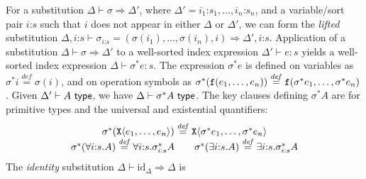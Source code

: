 \documentclass{sigplanconf}
\newcommand{\id}{\mathrm{id}}
\newcommand{\indexOp}[1]{\textup{\texttt{#1}}}
\newcommand{\tyPrim}[2]{\textup{\texttt{#1}}\langle #2 \rangle}
\newcommand{\isType}{\textup{\textsf{ type}}}
\newtheorem{lemma}{Lemma}
\newcommand{\isDefinedAs}{\stackrel{\mathit{def}}=}
\theoremstyle{examplestyle}
\theoremstyle{restatementstyle}
\begin{document}
For a substitution $\Delta \vdash \sigma \Rightarrow
\Delta'$, where $\Delta' = i_1\mathord:s_1,\ldots,i_n\mathord:s_n$, and a
variable/sort pair $i\mathord:s$ such that $i$ does not appear in
either $\Delta$ or $\Delta'$, we can form the \emph{lifted}
substitution $\Delta,i\mathord:s \vdash
\sigma_{i\mathord:s} = (\sigma(i_1), \ldots, \sigma(i_n), i) \Rightarrow
\Delta',i\mathord:s$. %
%
Application of a substitution $\Delta \vdash \sigma
\Rightarrow \Delta'$ to a well-sorted index expression $\Delta' \vdash
e : s$ yields a well-sorted index expression $\Delta \vdash \sigma^*e
: s$. The expression $\sigma^*e$ is defined on variables as $\sigma^*i
\isDefinedAs \sigma(i)$, and on operation symbols as
$\sigma^*(\indexOp{f}(e_1,\ldots,e_n)) \isDefinedAs
\indexOp{f}(\sigma^*e_1, \ldots, \sigma^*e_n)$.  %
Given
$\Delta' \vdash A \isType$, 
we have $\Delta \vdash \sigma^*A
\isType$. The key clauses defining $\sigma^*A$ are for primitive types
and the universal and existential quantifiers:
\begin{displaymath}
  \begin{array}{c}
    \sigma^*(\tyPrim{X}{e_1,\ldots,e_n}) \isDefinedAs \tyPrim{X}{\sigma^*e_1,\ldots,\sigma^*e_n}
    \\
    \begin{array}{c@{\hspace{2em}}c}
      \sigma^*(\forall i\mathord:s.A) \isDefinedAs \forall i\mathord:s.\sigma_{i\mathord:s}^*A
      &
      \sigma^*(\exists i\mathord:s.A) \isDefinedAs \exists i\mathord:s. \sigma_{i\mathord:s}^*A
    \end{array}
  \end{array}
\end{displaymath}
The \emph{identity} substitution $\Delta \vdash
\id_\Delta \Rightarrow \Delta$ is %
\end{document}
